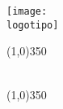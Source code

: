 
\begin{titlepage} 

	\begin{center}
	\texttt{[image: \\logotipo]}

	\line(1,0){350} \\ 

		\vspace*{2mm}

	{\Huge \titulo} \\

		\vspace*{2mm}
	\line(1,0){350} \\ 

		\vspace*{2mm}

	{\Large \empresa} \\

		\vspace*{20mm}

	{\Large \autores} \\ 

		\vspace*{\fill}

	\end{center}

	\begin{flushright} 

		{\large \departamento} \\
			\vspace{2mm}
		{\large \versao}
		
	\end{flushright}

\end{titlepage}
